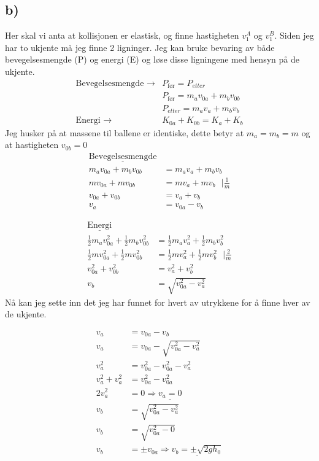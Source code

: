 \documentclass[a4paper,12pt,norsk]{article}
\begin{document}
\subsection*{b)}
Her skal vi anta at kollisjonen er elastisk, og finne hastigheten $v_1^A$ og $v_1^B$. Siden jeg har to ukjente må jeg finne 2 ligninger. Jeg kan bruke bevaring av både bevegelsesmengde (P) og energi (E) og løse disse ligningene med hensyn på de ukjente. 
\begin{align*}
\textrm{Bevegelsesmengde } \rightarrow & P_{\textrm{før}} = P_{etter} \\
& P_{\textrm{før}} = m_av_{0a} + m_bv_{0b}\\
& P_{etter} = m_av_a + m_bv_b\\
\textrm{Energi } \rightarrow & K_{0a} + K_{0b} = K_a + K_b
\end{align*}
Jeg husker på at massene til ballene er identiske, dette betyr at $m_a = m_b = m$ og at hastigheten $v_{0b} = 0$
\begin{align*}
\underline{\textrm{Bevegelsesmengde}}\\
m_av_{0a} + m_bv_{0b} &= m_av_a + m_bv_b \\
mv_{0a} + mv_{0b} &= mv_a + mv_b\textrm{ } |\frac{1}{m}\\
v_{0a} + v_{0b} &= v_a + v_b\\
v_a &= v_{0a} - v_b
\end{align*}

\begin{align*}
\underline{\textrm{Energi}}\\
\frac{1}{2}m_av_{0a}^2 + \frac{1}{2}m_bv_{0b}^2 &= \frac{1}{2}m_av_{a}^2 + \frac{1}{2}m_bv_{b}^2\\
\frac{1}{2}mv_{0a}^2+\frac{1}{2}mv_{0b}^2&=\frac{1}{2}mv_{a}^2+\frac{1}{2}mv_{b}^2 \textrm{ }|\frac{2}{m}\\ 
v_{0a}^2+v_{0b}^2&=v_{a}^2+v_{b}^2\\
v_b &= \sqrt{v_{0a}^2 -v_a^2}
\end{align*}
Nå kan jeg sette inn det jeg har funnet for hvert av utrykkene for å finne hver av de ukjente. 

\begin{align*}
v_a &= v_{0a} - v_b \\
v_a &= v_{0a} - \sqrt{v_{0a}^2 -v_a^2}\\
v_a^2 &= v_{0a}^2 - v_{0a}^2 -v_a^2\\
v_a^2+v_a^2 &= v_{0a}^2 - v_{0a}^2\\
2v_a^2 &= 0 \Rightarrow \underline{v_a = 0}\\
v_b &= \sqrt{v_{0a}^2 -v_a^2}\\
v_b &= \sqrt{v_{0a}^2 - 0}\\
v_b &= \pm v_{0a} \Rightarrow \underline{v_b = \pm\sqrt{2gh_0}}
\end{align*}
\end{document}
